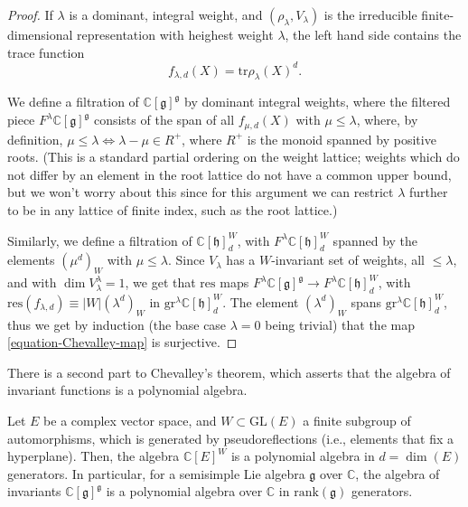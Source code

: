 \begin{proof}
If $\lambda$ is a dominant, integral weight, and $(\rho_\lambda, V_\lambda)$ is the irreducible finite-dimensional representation with heighest weight $\lambda$, the left hand side contains the trace function 
 $$ f_{\lambda,d}(X) = \text{tr} \rho_\lambda(X)^d.$$


We define a filtration of $\mathbb C[\mathfrak g]^{\mathfrak g}$ by dominant integral weights, where the filtered piece $F^\lambda \mathbb C[\mathfrak g]^{\mathfrak g}$ consists of the span of all $f_{\mu,d}(X)$ with $\mu\le \lambda$, where, by definition, $\mu\le \lambda \iff \lambda-\mu \in R^+$, where $R^+$ is the monoid spanned by positive roots. (This is a standard partial ordering on the weight lattice; weights which do not differ by an element in the root lattice do not have a common upper bound, but we won't worry about this since for this argument we can restrict $\lambda$ further to be in any lattice of finite index, such as the root lattice.) 

Similarly, we define a filtration of $\mathbb C[\mathfrak h]_d^W$, with $F^\lambda\mathbb C[\mathfrak h]_d^W$ spanned by the elements $(\mu^d)_W$ with $\mu\le \lambda$. Since $V_\lambda$ has a $W$-invariant set of weights, all $\le \lambda$, and with $\dim V_\lambda^\lambda=1$, we get that $\text{res}$ maps $F^\lambda \mathbb C[\mathfrak g]^{\mathfrak g} \to F^\lambda\mathbb C[\mathfrak h]_d^W$, with $\text{res}(f_{\lambda,d}) \equiv |W| (\lambda^d)_W$ in $\text{gr}^\lambda \mathbb C[\mathfrak h]_d^W$. The element $(\lambda^d)_W$ spans $\text{gr}^\lambda \mathbb C[\mathfrak h]_d^W$, thus we get by induction (the base case $\lambda = 0$ being trivial) that the map \eqref{equation-Chevalley-map} is surjective. 
\end{proof}


There is a second part to Chevalley's theorem, which asserts that the algebra of invariant functions is a polynomial algebra.

\begin{theorem}
\label{theorem-invariants-polynomial}
 Let $E$ be a complex vector space, and $W\subset \text{GL}(E)$ a finite subgroup of automorphisms, which is generated by pseudoreflections (i.e., elements that fix a hyperplane). Then, the algebra $\mathbb C[E]^W$ is a polynomial algebra in $d=\dim(E)$ generators. In particular, for a semisimple Lie algebra $\mathfrak g$ over $\mathbb C$, the algebra of invariants $\mathbb C[\mathfrak g]^{\mathfrak g}$ is a polynomial algebra over $\mathbb C$ in $\text{rank}(\mathfrak g)$ generators.
\end{theorem}


